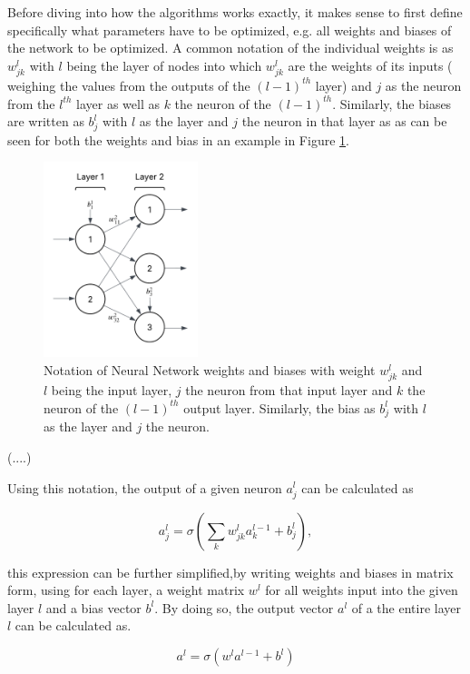  Before diving into how the algorithms works exactly, it makes sense to first define specifically what parameters have to be optimized, e.g. all weights and biases of the network to be optimized. A common notation of the individual weights is as $w_{jk}^l$ with $l$ being the layer of nodes into which $w_{jk}^l$ are the weights of its inputs ( weighing the values from the outputs of the $(l-1)^{th}$ layer) and $j$ as the neuron from the $l^{th}$ layer as well as $k$ the neuron of the  $(l-1)^{th}$. Similarly, the biases are written as $b_j^l$ with $l$ as the layer and $j$ the neuron in that layer as as can be seen for both the weights and bias in an example in Figure \ref{fig:bias_and_weights_notation}.
 
 
 \begin{figure}[h] 
 	\centering
 	\includegraphics[width=0.4\textwidth]{figures/modelling/bias_and_weights_notation.png} 
 	\caption{Notation of Neural Network weights and biases with weight $w_{jk}^l$ and $l$ being the input layer,  $j$ the neuron from that input layer and $k$ the neuron of the  $(l-1)^{th}$ output layer. Similarly, the bias as $b_j^l$ with $l$ as the layer and $j$ the neuron.}
 	\label{fig:bias_and_weights_notation}
 \end{figure}
 (....) 
 
 Using this notation, the output of a given neuron $a_j^l$ can be calculated as 
 
 $$
 a_j^l = \sigma\left( \sum_k w_{jk}^l a_k^{l-1} + b_j^l \right),
 $$
 
 this expression can be further simplified,by writing weights and biases in matrix form, using for each layer, a weight matrix $w^l$ for all weights input into the given layer $l$ and a bias vector $b^l$. By doing so, the output vector $a^l$ of a the entire layer $l$ can be calculated as.
 
 $$a^l = \sigma (w^la^{l-1}+b^l)$$
 
